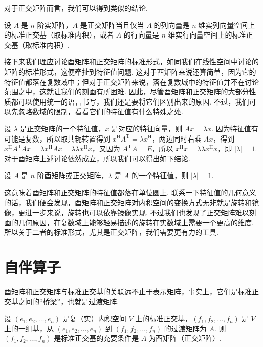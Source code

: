 对于正交矩阵而言，我们可以得到类似的结论.

\begin{theorem}
    设 $ A $ 是 $ n $ 阶实矩阵，$ A $ 是正交矩阵当且仅当 $ A $ 的列向量是 $ n $ 维实列向量空间上的标准正交基（取标准内积），或者 $ A $ 的行向量是 $ n $ 维实行向量空间上的标准正交基（取标准内积）.
\end{theorem}

接下来我们理应讨论酉矩阵和正交矩阵的标准形式，如同我们在线性空间中讨论的矩阵的标准形式，这便牵扯到特征值问题. 这对于酉矩阵来说还算简单，因为它的特征值都落在复数域中；但对于正交矩阵来说，落在复数域中的特征值并不在讨论范围之中，这就让我们的刻画有所困难. 因此，尽管酉矩阵和正交矩阵的大部分性质都可以使用统一的语言书写，我们还是要将它们区别出来的原因. 不过，我们可以先忽略数域的限制，看看它们的特征值有什么特殊之处.

设 $ \lambda $ 是正交矩阵的一个特征值，$ x $ 是对应的特征向量，则 $ Ax = \lambda x $. 因为特征值有可能是复数，所以取共轭转置得到 $ x^{\mathrm{H}}A^{\mathrm{T}} = \bar{\lambda} x^{\mathrm{H}} $，两边同时右乘 $ Ax $，得到 $ x^{\mathrm{H}}A^{\mathrm{T}}Ax = \bar{\lambda} x^{\mathrm{H}}Ax = \bar{\lambda} \lambda x^{\mathrm{H}}x $，又因为 $ A^{\mathrm{T}}A = E $，所以 $ x^{\mathrm{H}}x = \bar{\lambda} \lambda x^{\mathrm{H}}x $，即 $ \lvert \lambda \rvert = 1 $. 对于酉矩阵上述讨论依然成立，所以我们可以得出如下结论.

\begin{theorem}
    设 $ A $ 是 $ n $ 阶酉矩阵或正交矩阵，$ \lambda $ 是 $ A $ 的一个特征值，则 $ \lvert \lambda \rvert = 1 $.
\end{theorem}

这意味着酉矩阵和正交矩阵的特征值都落在单位圆上. 联系一下特征值的几何意义的话，我们便会发现，酉矩阵和正交矩阵对内积空间的变换方式无非就是旋转和镜像，更进一步来说，旋转也可以依靠镜像实现. 不过我们也发现了正交矩阵难以刻画的几何原因，在复数域上能够轻易描述的旋转在实数域上需要一个更高的维度. 所以关于二者的标准形式，尤其是正交矩阵，我们需要更有力的工具.

\section{自伴算子}

酉矩阵和正交矩阵与标准正交基的关联远不止于表示矩阵，事实上，它们是标准正交基之间的“桥梁”，也就是过渡矩阵.

\begin{theorem}
    设 $ (e_1, e_2, \ldots , e_n) $ 是复（实）内积空间 $ V $ 上的标准正交基，$ (f_1, f_2, \ldots , f_n) $ 是 $ V $ 上的一组基，从 $ (e_1, e_2, \ldots , e_n) $ 到 $ (f_1, f_2, \ldots , f_n) $ 的过渡矩阵为 $ A $. 则 $ (f_1, f_2, \ldots , f_n) $ 是标准正交基的充要条件是 $ A $ 为酉矩阵（正交矩阵）.
\end{theorem}

